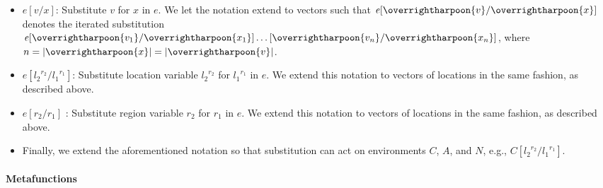\documentclass[showabstract,showacknowledgments,showpreface,showdedication,school]{iuphd}
\theoremstyle{nonumberplain}
\newcommand{\keywd}[1]{\mathit{#1}}
\newcommand{\skeywd}[1]{\mathit{#1}}
\newcommand{\EXPR}{\keywd{e}}
\newcommand{\loc}{\skeywd{l}}
\newcommand{\reg}{\skeywd{r}}
\newcommand{\CENV}{\keywd{C}}
\newcommand{\AENV}{\keywd{A}}
\newcommand{\NENV}{\keywd{N}}
\newcommand{\locreg}[2]{\ensuremath{{#1}^{#2}}}
\newcommand{\subst}[3]{\ensuremath{#1[#3/#2]}}
\newcommand{\overharpoon}[1]{\overrightharpoon{#1}}
\begin{document}
\begin{itemize}
\item $\subst{\EXPR}{x}{v}$: Substitute $v$ for $x$ in $e$. We let the notation extend to vectors such that
$\subst{\EXPR}{\overharpoon{x}}{\overharpoon{v}}$ denotes the iterated substitution $\subst{\EXPR}{\overharpoon{x_1}}{\overharpoon{v_1}} \ldots \subst{}{\overharpoon{x_n}}{\overharpoon{v_n}}$, where $n = |\overharpoon{x}| = |\overharpoon{v}|$.

\item $\subst{\EXPR}{\locreg{\loc_1}{\reg_1}}{\locreg{\loc_2}{\reg_2}}$: Substitute location variable $\locreg{\loc_2}{\reg_2}$ for $\locreg{\loc_1}{\reg_1}$ in $\EXPR$. We extend this notation to vectors of locations in the same fashion, as described above.

\item $\subst{\EXPR}{\reg_1}{\reg_2}$ : Substitute region variable $\reg_2$ for $\reg_1$ in $\EXPR$. We extend this notation to vectors of locations in the same fashion, as described above.

\item Finally, we extend the aforementioned notation so that
  substitution can act on environments $\CENV$, $\AENV$, and $\NENV$,
  e.g.,
  $\subst{\CENV}{\locreg{\loc_1}{\reg_1}}{\locreg{\loc_2}{\reg_2}}$.
\end{itemize}

\paragraph{Metafunctions}
\end{document}

